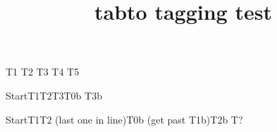 \documentclass{article}
\title{tabto tagging test}
\begin{document}
\kant[1][1] \tabto{3cm}T1 \tabto{4cm}T2
\tabto{3cm}T3 \kant[1][2] \tabto{4cm}T4
\tabto*{2cm}T5

Start\tab T1\tab T2\tab T3\tab T0b \tab\tab T3b

Start\tab T1\tab T2 (last one in line)\tab T0b
(get past T1b)\tab T2b T?
\end{document}
